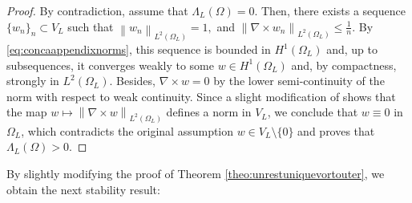 \documentclass[a4paper,11pt]{amsart}
\numberwithin{equation}{section}
\numberwithin{figure}{section}
\newcommand{\norm}[1]{\left \lVert #1 \right \rVert}
\begin{document}
\begin{proof}
	By contradiction, assume that $\Lambda_L(\Omega)=0$. Then, there exists a sequence $\{w_n\}_{n}\subset  {V}_L$ such that $\norm{w_n}_{L^2(\Omega_L)}=1,$ and $\norm{\nabla\times w_n}_{L^2(\Omega_L)}\leq \frac{1}{n}$. By \eqref{eq:concaappendixnorms}, this sequence is bounded in $H^1(\Omega_L)$ and, up to subsequences, it converges weakly to some $w\in H^1(\Omega_L)$ and, by compactness, strongly in $L^2(\Omega_L)$. Besides, $\nabla\times w=0$ by the lower semi-continuity of the norm with respect to weak continuity. Since a slight modification of \cite[Lemma A.2]{concaenglish} shows that the map $w\mapsto \norm{\nabla\times w}_{L^2(\Omega_L)}$ defines a norm in $V_L$, we conclude that $w\equiv 0$ in $\Omega_L$, which contradicts the original assumption $w\in V_L \setminus \{0\}$ and proves that $\Lambda_L(\Omega)>0$.
\end{proof}

 By slightly modifying the proof of Theorem \ref{theo:unrestuniquevortouter}, we obtain the next stability result:
\end{document}
